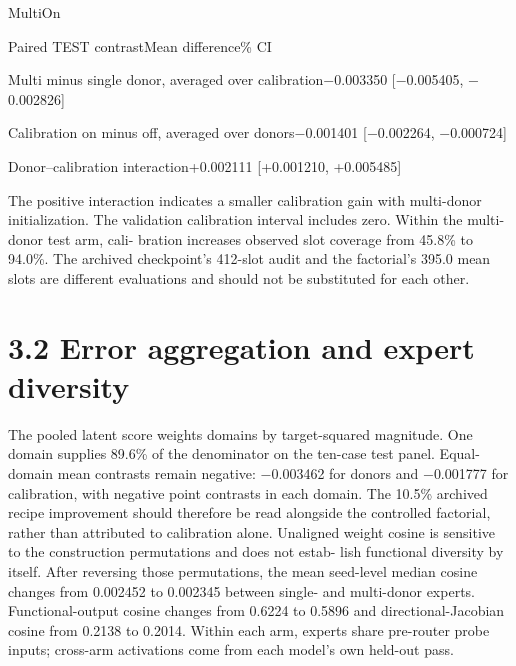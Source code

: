 \documentclass[11pt]{article}
\begin{document}
\noindent Multi\quad On\par



\noindent Paired TEST contrast\quad Mean difference\% CI\par


\noindent Multi minus single donor, averaged over calibration\quad \ensuremath{-}0.003350 [\ensuremath{-}0.005405, \ensuremath{-}0.002826]\par


\noindent Calibration on minus off, averaged over donors\quad \ensuremath{-}0.001401 [\ensuremath{-}0.002264, \ensuremath{-}0.000724]\par


\noindent Donor–calibration interaction\quad +0.002111 [+0.001210, +0.005485]\par

The positive interaction indicates a smaller calibration gain with multi-donor initialization.
The validation calibration interval includes zero. Within the multi-donor test arm, cali-
bration increases observed slot coverage from 45.8\% to 94.0\%. The archived checkpoint’s
412-slot audit and the factorial’s 395.0 mean slots are different evaluations and should not
be substituted for each other.

\section*{3.2 Error aggregation and expert diversity}

The pooled latent score weights domains by target-squared magnitude. One domain supplies
89.6\% of the denominator on the ten-case test panel. Equal-domain mean contrasts remain
negative: \ensuremath{-}0.003462 for donors and \ensuremath{-}0.001777 for calibration, with negative point contrasts
in each domain. The 10.5\% archived recipe improvement should therefore be read alongside
the controlled factorial, rather than attributed to calibration alone.
Unaligned weight cosine is sensitive to the construction permutations and does not estab-
lish functional diversity by itself. After reversing those permutations, the mean seed-level
median cosine changes from 0.002452 to 0.002345 between single- and multi-donor experts.
Functional-output cosine changes from 0.6224 to 0.5896 and directional-Jacobian cosine
from 0.2138 to 0.2014. Within each arm, experts share pre-router probe inputs; cross-arm
activations come from each model’s own held-out pass.
\end{document}
